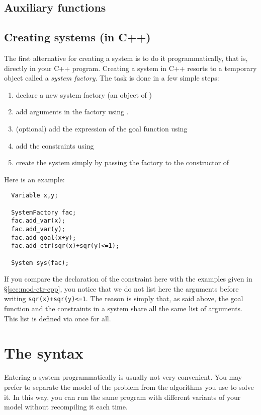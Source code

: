 \subsection{Auxiliary functions}\label{sec:mod-sys-auxfunc}

\subsection{Creating systems (in C++)}

The first alternative for creating a system is to do it programmatically, that is, directly in your C++ program.
Creating a system in C++ resorts to a temporary object called a {\it system factory}. The task is done in a few simple steps:
\begin{enumerate}
\item declare a new system factory (an object of )
\item add arguments in the factory using .
\item (optional) add the expression of the goal function using 
\item add the constraints using 
\item create the system simply by passing the factory to the constructor of 
\end{enumerate}

Here is an example:

\begin{lstlisting}
  Variable x,y;

  SystemFactory fac;
  fac.add_var(x);
  fac.add_var(y);
  fac.add_goal(x+y);
  fac.add_ctr(sqr(x)+sqr(y)<=1);

  System sys(fac);
\end{lstlisting}

If you compare the declaration of the constraint here with the examples given in \S\ref{sec:mod-ctr-cpp},
you notice that we do not list here the arguments before writing {\tt sqr(x)+sqr(y)<=1}.
The reason is simply that, as said above, the goal function and the constraints in a system
share all the same list of arguments. This list is defined via  once for all.

\section{The \quimper syntax}\label{sec:mod-sys-load}

Entering a system programmatically is usually not very convenient.
You may prefer to separate the model of the problem from the algorithms
you use to solve it. In this way, you can run the same program with different
variants of your model without recompiling it each time.

